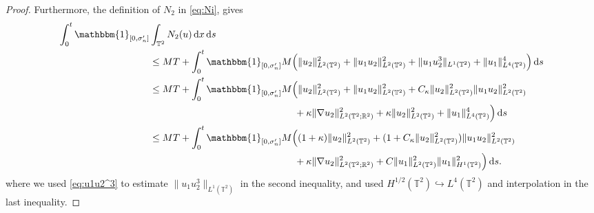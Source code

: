 \documentclass{amsart}
\newcommand{\dd}{\,\mathrm{d}}
\newcommand{\one}{\mathbbm{1}}
\newcommand{\<}{\langle}
\newcommand{\?}{\rangle}
\newcommand{\into}{\hookrightarrow}
\newcommand{\Tor}{\mathbb{T}}
\renewcommand{\Tor}{\mathbb{T}^2}
\theoremstyle{plain}
\theoremstyle{remark}
\theoremstyle{plain}
\numberwithin{equation}{section}
\def\R{{\mathbb R}}
\begin{document}
\begin{proof}
Furthermore, the definition of $N_2$ in \eqref{eq:Ni},  gives
\begin{align*}
\int_0^t \one_{[0,\sigma_n']}&\int_{\Tor} N_2(u)\dd x\dd s \\
   &  \leq MT+ \int_0^t \one_{[0,\sigma_n']} M\Big(\|u_2\|_{L^2(\Tor)}^2+\|u_1u_2\|_{L^2(\Tor)}^2+\|u_1u_2^3\|_{L^1(\Tor)}+\|u_1\|_{L^4(\Tor)}^4\Big)\dd s\\
&\leq  MT+\int_0^t \one_{[0,\sigma_n']}M\Big(\|u_2\|_{L^2(\Tor)}^2+\|u_1u_2\|_{L^2(\Tor)}^2+C_\kappa\|u_2\|_{L^2(\Tor)}^2\|u_1u_2\|_{L^2(\Tor)}^2 \\
   &\qquad\qquad\qquad\qquad\qquad\qquad\qquad\quad +\kappa\|\nabla u_2 \|_{L^2(\Tor;\R^2)}^2+\kappa\|u_2\|_{L^2(\Tor)}^2+\|u_1\|_{L^4(\Tor)}^4\Big)\dd s\\
&\leq  MT+ \int_0^t \one_{[0,\sigma_n']}M\Big((1+\kappa)\|u_2\|_{L^2(\Tor)}^2+(1+C_\kappa\|u_2\|_{L^2(\Tor)}^2)\|u_1u_2\|_{L^2(\Tor)}^2\\
   &\qquad\qquad\qquad\qquad\qquad\qquad\qquad\quad+\kappa\|\nabla u_2 \|_{L^2(\Tor;\R^2)}^2+C\|u_1\|_{L^2(\Tor)}^2\| u_1\|_{H^1(\Tor )}^2\Big)\dd s.
\end{align*} 
where we used \eqref{eq:u1u2^3} to estimate  $\|u_1u_2^3\|_{L^1(\Tor)}$ in the second inequality, and used   $H^{1/2}(\Tor)\into L^4(\Tor)$ and interpolation in the last inequality. 
 

\end{proof}
\end{document}
